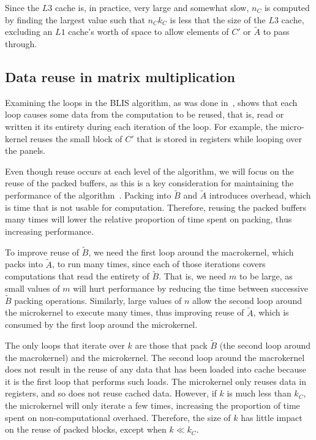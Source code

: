 \documentclass[12pt]{article}
\newcommand*{\mycite}[1]{~\cite{#1}}
\begin{document}
Since the $L3$ cache is, in practice, very large and somewhat slow, $n_C$ is computed by finding the largest value such that $n_Ck_C$ is less that the size of the $L3$ cache, excluding an $L1$ cache's worth of space to allow elements of $C'$ or $\widetilde{A}$ to pass through.

\subsection{Data reuse in  matrix multiplication}
Examining the loops in the BLIS algorithm, as was done in\mycite{Low2016}, shows that each loop causes some data from the computation to be reused, that is, read or written it its entirety during each iteration of the loop.
For example, the micro-kernel reuses the small block of $C'$ that is stored in registers while looping over the panels.

Even though reuse occurs at each level of the algorithm, we will focus on the reuse of the packed buffers, as this is a key consideration for maintaining the performance of the algorithm\mycite{Henry92}.
Packing into $\widetilde{B}$ and $\widetilde{A}$ introduces overhead, which is time that is not usable for computation.
Therefore, reusing the packed buffers many times will lower the relative proportion of time spent on packing, thus increasing performance.

To improve reuse of $\widetilde{B}$, we need the first loop around the macrokernel, which packs into $\widetilde{A}$, to run many times, since each of those iterations covers computations that read the entirety of $\widetilde{B}$.
That is, we need $m$ to be large, as small values of $m$ will hurt performance by reducing the time between successive $\widetilde{B}$ packing operations.
Similarly, large values of $n$ allow the second loop around the microkernel to execute many times, thus improving reuse of $\widetilde{A}$, which is consumed by the first loop around the microkernel.

The only loops that iterate over $k$ are those that pack $\widetilde{B}$ (the second loop around the macrokernel) and the microkernel.
The second loop around the macrokernel does not result in the reuse of any data that has been loaded into cache because it is the first loop that performs such loads.
The microkernel only reuses data in registers, and so does not reuse cached data.
However, if $k$ is much less than $k_C$, the microkernel will only iterate a few times, increasing the proportion of time spent on non-computational overhaed.
Therefore, the size of $k$ has little impact on the reuse of packed blocks, except when $k \ll k_C$.
\end{document}
